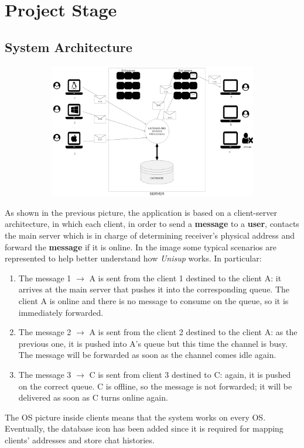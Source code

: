 \section{Project Stage}
\subsection{System Architecture}


\begin{figure}[H]
	\begin{subfigure}{\textwidth}
	\centering
		\includegraphics[width=0.7\linewidth]{img/systemArchitecture.png} 
	\end{subfigure}
\end{figure}

As shown in the previous picture, the application is based on a client-server architecture, in which each client, in order to send a \textbf{message} to a \textbf{user}, contacts the main server which is in charge of determining receiver’s physical address and forward the \textbf{message} if it is online.
In the image some typical scenarios are represented to help better understand how \textit{Unisup} works. In particular:
\begin{enumerate}
	\item The message 1 $\xrightarrow{}$ A is sent from the client 1 destined to the client A:  it arrives at the main server that pushes it into the corresponding queue. The client A is online and there is no message to consume on the queue, so it is immediately forwarded.
	\item The message 2 $\xrightarrow{}$ A is sent from the client 2 destined to the client A:  as the previous one, it is pushed into A’s queue but this time the channel is busy. The message will be forwarded as soon as the channel comes idle again.
	\item The message 3 $\xrightarrow{}$ C is sent from client 3 destined to C: again, it is pushed on the correct queue. C is offline, so the message is not forwarded; it will be delivered as soon as C turns online again.
\end{enumerate}	
The OS picture inside clients means that the system works on every OS.
Eventually, the database icon has been added since it is required for mapping clients’ addresses and store chat histories. 


